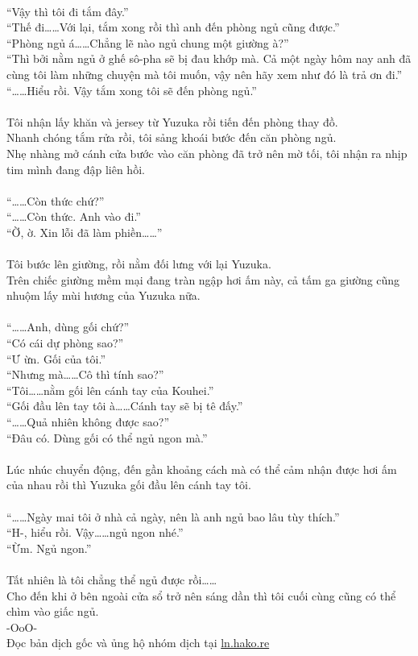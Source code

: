 \documentclass[12pt,a4paper, twosides]{book}
\begin{document}
\\
“Vậy thì tôi đi tắm đây.”\\
“Thế đi……Với lại, tắm xong rồi thì anh đến phòng ngủ cũng được.”\\
“Phòng ngủ á……Chẳng lẽ nào ngủ chung một giường à?”\\
“Thì bởi nằm ngủ ở ghế sô-pha sẽ bị đau khớp mà. Cả một ngày hôm nay anh đã cùng tôi làm những chuyện mà tôi muốn, vậy nên hãy xem như đó là trả ơn đi.”\\
“……Hiểu rồi. Vậy tắm xong tôi sẽ đến phòng ngủ.”\\
\\
Tôi nhận lấy khăn và jersey từ Yuzuka rồi tiến đến phòng thay đồ.\\
Nhanh chóng tắm rửa rồi, tôi sảng khoái bước đến căn phòng ngủ.\\
Nhẹ nhàng mở cánh cửa bước vào căn phòng đã trở nên mờ tối, tôi nhận ra nhịp tim mình đang đập liên hồi.\\
\\
“……Còn thức chứ?”\\
“……Còn thức. Anh vào đi.”\\
“Ờ, ờ. Xin lỗi đã làm phiền……”\\
\\
Tôi bước lên giường, rồi nằm đối lưng với lại Yuzuka.\\
Trên chiếc giường mềm mại đang tràn ngập hơi ấm này, cả tấm ga giường cũng nhuộm lấy mùi hương của Yuzuka nữa.\\
\\
“……Anh, dùng gối chứ?”\\
“Có cái dự phòng sao?”\\
“Ư ừn. Gối của tôi.”\\
“Nhưng mà……Cô thì tính sao?”\\
“Tôi……nằm gối lên cánh tay của Kouhei.”\\
“Gối đầu lên tay tôi à……Cánh tay sẽ bị tê đấy.”\\
“……Quả nhiên không được sao?”\\
“Đâu có. Dùng gối có thể ngủ ngon mà.”\\
\\
Lúc nhúc chuyển động, đến gần khoảng cách mà có thể cảm nhận được hơi ấm của nhau rồi thì Yuzuka gối đầu lên cánh tay tôi.\\
\\
“……Ngày mai tôi ở nhà cả ngày, nên là anh ngủ bao lâu tùy thích.”\\
“H-, hiểu rồi. Vậy……ngủ ngon nhé.”\\
“Ừm. Ngủ ngon.”\\
\\
Tất nhiên là tôi chẳng thể ngủ được rồi……\\
Cho đến khi ở bên ngoài cửa sổ trở nên sáng dần thì tôi cuối cùng cũng có thể chìm vào giấc ngủ.\\
-OoO-\\
Đọc bản dịch gốc và ủng hộ nhóm dịch tại \href{https://ln.hako.re/}{ln.hako.re}\\
\newpage
\end{document}
